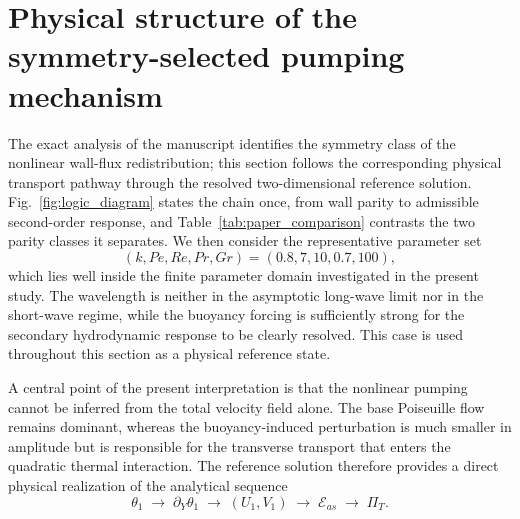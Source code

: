 \documentclass[12pt,a4paper]{article}
\newcommand{\Rey}{\mathit{Re}}
\newcommand{\Pe}{\mathit{Pe}}
\newcommand{\Grr}{\mathit{Gr}}
\renewcommand{\Pr}{\mathit{Pr}}
\newcommand{\PiT}{\Pi_T}
\begin{document}
\section{Physical structure of the symmetry-selected pumping mechanism}
\label{sec:physical_mechanism}

The exact analysis of the manuscript identifies the symmetry class of the
nonlinear wall-flux redistribution; this section follows the corresponding
physical transport pathway through the resolved two-dimensional reference
solution. Fig.~\ref{fig:logic_diagram} states the chain once, from wall parity to
admissible second-order response, and Table~\ref{tab:paper_comparison} contrasts
the two parity classes it separates. We then consider the representative
parameter set
\begin{equation}
(k,\Pe,\Rey,\Pr,\Grr)=(0.8,7,10,0.7,100),
\label{eq:physical_reference_case}
\end{equation}
which lies well inside the finite parameter domain investigated in the present
study. The wavelength is neither in the asymptotic long-wave limit nor in the
short-wave regime, while the buoyancy forcing is sufficiently strong for the
secondary hydrodynamic response to be clearly resolved. This case is used
throughout this section as a physical reference state.

A central point of the present interpretation is that the nonlinear pumping
cannot be inferred from the total velocity field alone. The base Poiseuille
flow remains dominant, whereas the buoyancy-induced perturbation is much
smaller in amplitude but is responsible for the transverse transport that
enters the quadratic thermal interaction. The reference solution therefore
provides a direct physical realization of the analytical sequence
\begin{equation}
\theta_1
\;\longrightarrow\;
\partial_Y\theta_1
\;\longrightarrow\;
(U_1,V_1)
\;\longrightarrow\;
\mathcal{E}_{as}
\;\longrightarrow\;
\PiT .
\end{equation}

\end{document}
